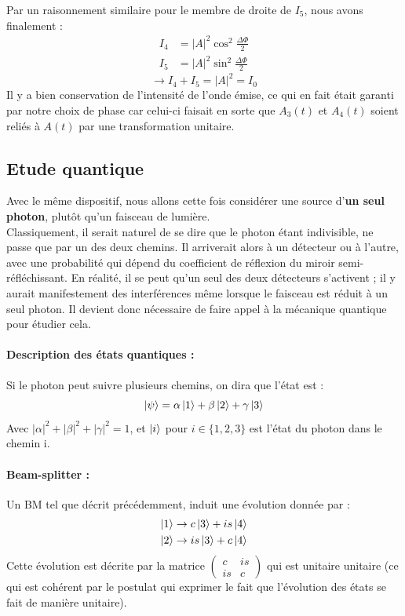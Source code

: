 \documentclass[../notesdecours.tex]{subfiles}
\begin{document}
Par un raisonnement similaire pour le membre de droite de $I_5$, nous avons finalement : 
\begin{align}
    I_4 &= \left| A \right|^2 \cos^2{\frac{\Delta \Phi}{2}} \\
    I_5 &= \left| A \right|^2 \sin^2{\frac{\Delta \Phi}{2}}
\end{align}
$$ \rightarrow I_4 + I_5 = \left| A \right|^2 = I_0 $$ 
Il y a bien conservation de l'intensité de l'onde émise, ce qui en fait était garanti par notre choix de phase car celui-ci faisait en sorte que $A_3(t)$ et $A_4(t)$ soient reliés à $A(t)$ par une transformation unitaire. 

\subsection{Etude quantique}

Avec le même dispositif, nous allons cette fois considérer une source d'\textbf{un seul photon}, plutôt qu'un faisceau de lumière. \\
Classiquement, il serait naturel de se dire que le photon étant indivisible, ne passe que par un des deux chemins. Il arriverait alors à un détecteur ou à l'autre, avec une probabilité qui dépend du coefficient de réflexion du miroir semi-réfléchissant. En réalité, il se peut qu'un seul des deux détecteurs s'activent ; il y aurait manifestement des interférences même lorsque le faisceau est réduit à un seul photon. Il devient donc nécessaire de faire appel à la mécanique quantique pour étudier cela. 

\paragraph{Description des \textbf{états quantiques} : }
Si le photon peut suivre plusieurs chemins, on dira que l'état est : 
\begin{equation}
    \ket{\psi} = \alpha\ket{1}+\beta\ket{2}+\gamma\ket{3}
\end{equation}\label{etat photon}
Avec $\left| \alpha \right|^2 + \left| \beta \right|^2 + \left| \gamma \right|^2 = 1$, et $\ket{i}$ pour $i \in \{ 1,2,3 \}$ est l'état du photon dans le chemin i. 

\paragraph{Beam-splitter :}
Un BM tel que décrit précédemment, induit une évolution donnée par : 
\begin{align}
    \ket{1} &\rightarrow c\ket{3} + is\ket{4} \notag\\
    \ket{2} &\rightarrow is\ket{3} + c\ket{4}
\end{align}\label{BM evolution}
Cette évolution est décrite par la matrice  $\begin{pmatrix}
c & is\\
is & c
\end{pmatrix}$ qui est unitaire unitaire (ce qui est cohérent par le postulat qui exprimer le fait que l'évolution des états se fait de manière unitaire).\\
\end{document}
